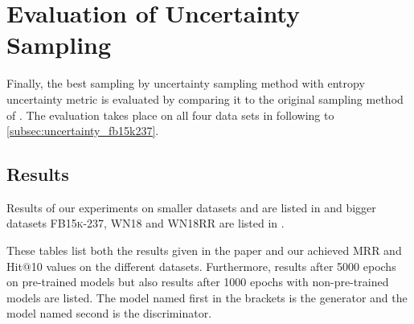 \section{Evaluation of Uncertainty Sampling}
\label{ch:evaluation:sec:evaluation_uncertainty}

Finally, the best sampling by uncertainty sampling method \ussoftmax with entropy uncertainty metric is evaluated by comparing it to the original sampling method \origsampling of \kbgan.
The evaluation takes place on all four data sets in following  to \ref{subsec:uncertainty_fb15k237}.









\subsection{Results}

Results of our experiments on smaller datasets \umls and \kinship  are listed in  and bigger datasets \textsc{FB15k-237},  \textsc{WN18} and  \textsc{WN18RR} are listed in .


These tables list both the results given in the \kbgan paper \cite{cai2017kbgan} and our achieved MRR and Hit@10 values on the different datasets.
Furthermore, results after 5000 epochs on pre-trained models but also results after 1000 epochs with non-pre-trained models are listed.
The model named first in the brackets is the generator and the model named second is the discriminator.

\newpage



